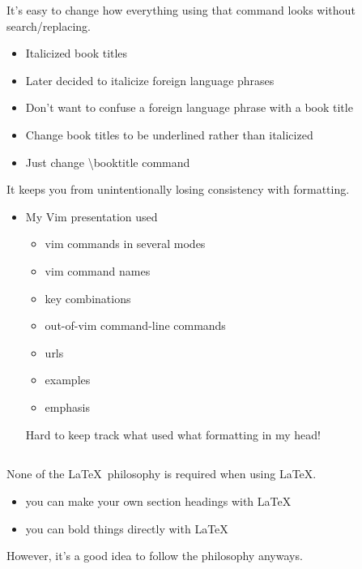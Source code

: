 \documentclass{beamer}                  %
\newcommand{\srule}{
	\rule{\textwidth}{1pt}\\
}
\newlength{\subsecwidth}
\newenvironment{slide}{
	\begin{frame} %
	\settowidth{\subsecwidth}{\insertsubsection} %
	\ifthenelse{\dimtest{\subsecwidth}{<}{1pt}}{ %
		\frametitle{\insertsection\\             %
		\vspace{-1ex}                            %
		\color{fore}\srule                       %
		\par                                     %
		\vspace{-3ex}                            %
		}
	}{                                           %
		\frametitle{\insertsection\ -- \insertsubsection\\ %
		\vspace{-1ex}                            %
		\color{fore}\srule                       %
		\par                                     %
		\vspace{-3ex}                            %
		}
	}
	\Large                                       %
}{
	\end{frame}
}
\begin{document}
\begin{slide}
	It's easy to change how everything using that command looks
	without search/replacing.
	\begin{itemize}
		\item Italicized book titles
		\item Later decided to italicize foreign language phrases
		\item Don't want to confuse a foreign language phrase with a book title
		\item Change book titles to be underlined rather than italicized
		\item Just change \textbackslash booktitle command
	\end{itemize}
\end{slide}

\begin{slide}
	It keeps you from unintentionally losing consistency with
	formatting.
	\begin{itemize}
		\item My Vim presentation used
		\begin{itemize}
			\item vim commands in several modes
			\item vim command names
			\item key combinations
			\item out-of-vim command-line commands
			\item urls
			\item examples
			\item emphasis
		\end{itemize}
		Hard to keep track what used what formatting in my head!
	\end{itemize}
\end{slide}

\subsection{} %
\begin{slide}
None of the \LaTeX\ philosophy is required when using \LaTeX.
\begin{itemize}
	\item you can make your own section headings with \LaTeX
	\item you can bold things directly with \LaTeX
\end{itemize}
However, it's a good idea to follow the philosophy anyways.
\end{slide}
\end{document}
